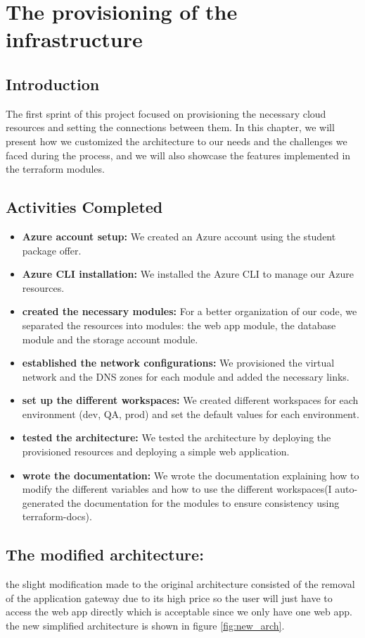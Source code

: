 \chapter{The provisioning of the infrastructure}

\section*{Introduction}
\noindent
The first sprint of this project focused on provisioning the necessary cloud resources and setting the connections between them. In this chapter, we will present how we customized the architecture to our needs and the challenges we faced during the process, and we will also showcase the features implemented in the terraform modules.

\section{Activities Completed}
\begin{itemize}
    \item \textbf{Azure account setup:} We created an Azure account using the student package offer.
    \item \textbf{Azure CLI installation:} We installed the Azure CLI to manage our Azure resources.
    \item \textbf{created the necessary modules:} For a better organization of our code, we separated the resources into modules: the web app module, the database module and the storage account module.
    \item \textbf{established the network configurations:} We provisioned the virtual network and the DNS zones for each module and added the necessary links.
    \item \textbf{set up the different workspaces:} We created different workspaces for each environment (dev, QA, prod) and set the default values for each environment.
    \item \textbf{tested the architecture:} We tested the architecture by deploying the provisioned resources and deploying a simple web application.
    \item \textbf{wrote the documentation:} We wrote the documentation explaining how to modify the different variables and how to use the different workspaces(I auto-generated the documentation for the modules to ensure consistency using terraform-docs).
\end{itemize}
\section{The modified architecture:}
the slight modification made to the original architecture consisted of the removal of the application gateway due to its high price so the user will just have to access the web app directly which is acceptable since we only have one web app.
\\ the new simplified architecture is shown in figure \ref{fig:new_arch}.

